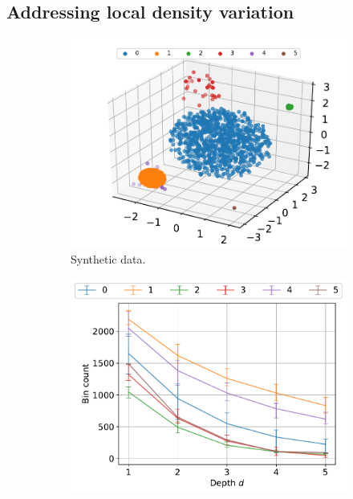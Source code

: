 \documentclass[11pt,onecolumn]{article}
\begin{document}
\pagebreak

\subsection{Addressing local density variation}

\begin{figure}[ht!]
    \centering
		\begin{subfigure}[t]{0.3\textwidth}
				\centering
				\includegraphics[width=\linewidth]{fig/syndata.pdf}
				\caption{Synthetic data.}
		\end{subfigure}
		\begin{subfigure}[t]{0.3\textwidth}
				\centering
				\includegraphics[width=\linewidth]{fig/chains_type_bincounts_k50c50d5.pdf}

\end{subfigure}
\end{figure}
\end{document}
